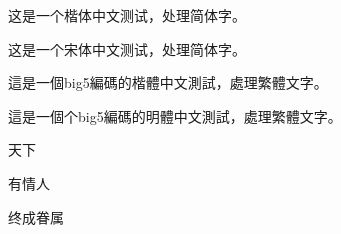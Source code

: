 \documentclass{article}
\begin{document}
\begin{CJK}{UTF8}{gkai}
这是一个楷体中文测试，处理简体字。
\end{CJK}

\begin{CJK}{UTF8}{gbsn}
这是一个宋体中文测试，处理简体字。
\end{CJK}

\begin{CJK}{UTF8}{bkai}
這是一個big5編碼的楷體中文測試，處理繁體文字。
\end{CJK}

\begin{CJK}{UTF8}{bsmi}
這是一個个big5編碼的明體中文測試，處理繁體文字。
\end{CJK}

\begin{CJK}{UTF8}{gbsn}
天下
\end{CJK}
\begin{CJK}{UTF8}{gkai}
有情人
\end{CJK}
\begin{CJK}{UTF8}{gbsn}
终成眷属
\end{CJK}
\end{document}

